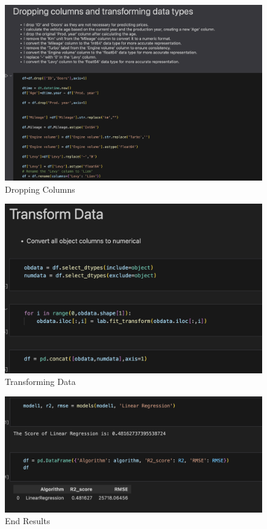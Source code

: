 \documentclass[paper=a4, fontsize=11pt,twoside]{scrartcl}
\begin{document}
\begin{figure}[h!]
\includegraphics[width=\textwidth]{drop.png}
\caption{\label{fig:your-figure}Dropping Columns}
\end{figure}

\begin{figure}[h!]
\includegraphics[width=\textwidth]{transform.png}
\caption{\label{fig:your-figure}Transforming Data}
\end{figure}

\begin{figure}[h!]
\includegraphics[width=\textwidth]{results.png}
\caption{\label{fig:your-figure}End Results}
\end{figure}
\end{document}
